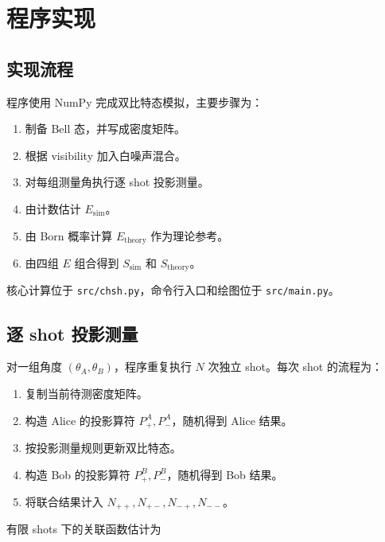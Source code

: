 \documentclass{zjureport}
\begin{document}
\clearpage

\section{程序实现}\label{ux7a0bux5e8fux5b9eux73b0}

\subsection{实现流程}\label{ux5b9eux73b0ux6d41ux7a0b}

程序使用 NumPy 完成双比特态模拟，主要步骤为：

\begin{enumerate}
\def\labelenumi{\arabic{enumi}.}
\item
  制备 Bell 态，并写成密度矩阵。
\item
  根据 visibility 加入白噪声混合。
\item
  对每组测量角执行逐 shot 投影测量。
\item
  由计数估计 \(E_{\mathrm{sim}}\)。
\item
  由 Born 概率计算 \(E_{\mathrm{theory}}\) 作为理论参考。
\item
  由四组 \(E\) 组合得到 \(S_{\mathrm{sim}}\) 和 \(S_{\mathrm{theory}}\)。
\end{enumerate}

核心计算位于 \texttt{src/chsh.py}，命令行入口和绘图位于 \texttt{src/main.py}。

\subsection{逐 shot 投影测量}\label{ux9010-shot-ux6295ux5f71ux6d4bux91cf}

对一组角度 \((\theta_A,\theta_B)\)，程序重复执行 \(N\) 次独立 shot。每次 shot 的流程为：

\begin{enumerate}
\def\labelenumi{\arabic{enumi}.}
\item
  复制当前待测密度矩阵。
\item
  构造 Alice 的投影算符 \(P_+^A,P_-^A\)，随机得到 Alice 结果。
\item
  按投影测量规则更新双比特态。
\item
  构造 Bob 的投影算符 \(P_+^B,P_-^B\)，随机得到 Bob 结果。
\item
  将联合结果计入 \(N_{++},N_{+-},N_{-+},N_{--}\)。
\end{enumerate}

有限 shots 下的关联函数估计为
\end{document}
